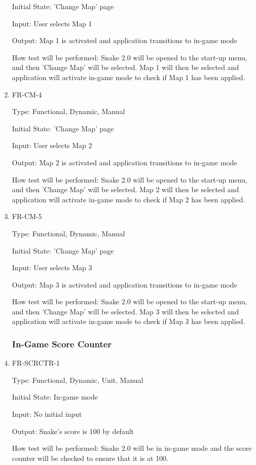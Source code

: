 \documentclass[12pt, titlepage]{article}
\begin{document}
\begin{enumerate}
Initial State: 'Change Map' page

Input: User selects Map 1

Output: Map 1 is activated and application transitions to in-game mode

How test will be performed: Snake 2.0 will be opened to the start-up menu, and then 'Change Map' will be selected. Map 1 will then be selected and application will activate in-game mode to check if Map 1 has been applied.

\item{FR-CM-4}
\label{fr:cm-4}

Type: Functional, Dynamic, Manual

Initial State: 'Change Map' page

Input: User selects Map 2

Output: Map 2 is activated and application transitions to in-game mode

How test will be performed: Snake 2.0 will be opened to the start-up menu, and then 'Change Map' will be selected. Map 2 will then be selected and application will activate in-game mode to check if Map 2 has been applied.

\item{FR-CM-5}
\label{fr:cm-5}

Type: Functional, Dynamic, Manual

Initial State: 'Change Map' page

Input: User selects Map 3

Output: Map 3 is activated and application transitions to in-game mode

How test will be performed: Snake 2.0 will be opened to the start-up menu, and then 'Change Map' will be selected. Map 3 will then be selected and application will activate in-game mode to check if Map 3 has been applied.

\subsubsection{In-Game Score Counter}

\item{FR-SCRCTR-1}
\label{fr:scrctr-1}

Type: Functional, Dynamic, Unit, Manual

Initial State: In-game mode

Input: No initial input

Output: Snake's score is 100 by default

How test will be performed: Snake 2.0 will be in in-game mode and the score counter will be checked to ensure that it is at 100.


\end{enumerate}
\end{document}
